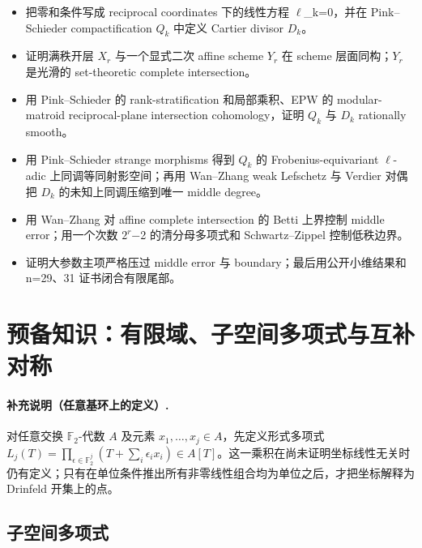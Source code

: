 \documentclass[11pt]{ctexart}
\begin{document}
\begin{itemize}

\item 把零和条件写成 reciprocal coordinates 下的线性方程 \ensuremath{\ell}\_k=0，并在 Pink–Schieder compactification \ensuremath{Q_{k}} 中定义 Cartier divisor \ensuremath{D_{k}}。

\item 证明满秩开层 \ensuremath{X_{r}} 与一个显式二次 affine scheme \ensuremath{Y_{r}} 在 scheme 层面同构；\ensuremath{Y_{r}} 是光滑的 set-theoretic complete intersection。

\item 用 Pink–Schieder 的 rank-stratification 和局部乘积、EPW 的 modular-matroid reciprocal-plane intersection cohomology，证明 \ensuremath{Q_{k}} 与 \ensuremath{D_{k}} rationally smooth。

\item 用 Pink–Schieder strange morphisms 得到 \ensuremath{Q_{k}} 的 Frobenius-equivariant \ensuremath{\ell}-adic 上同调等同射影空间；再用 Wan–Zhang weak Lefschetz 与 Verdier 对偶把 \ensuremath{D_{k}} 的未知上同调压缩到唯一 middle degree。

\item 用 Wan–Zhang 对 affine complete intersection 的 Betti 上界控制 middle error；用一个次数 \ensuremath{2^{r}}−2 的清分母多项式和 Schwartz–Zippel 控制低秩边界。

\item 证明大参数主项严格压过 middle error 与 boundary；最后用公开小维结果和 n=29、31 证书闭合有限尾部。

\end{itemize}

\section{预备知识：有限域、子空间多项式与互补对称}

\paragraph{补充说明（任意基环上的定义）.} 对任意交换 $\mathbb F_2$-代数 $A$ 及元素 $x_1,\ldots,x_j\in A$，先定义形式多项式 $L_j(T)=\prod_{\epsilon\in\mathbb F_2^j}(T+\sum_i\epsilon_i x_i)\in A[T]$。这一乘积在尚未证明坐标线性无关时仍有定义；只有在单位条件推出所有非零线性组合均为单位之后，才把坐标解释为 Drinfeld 开集上的点。

\subsection{子空间多项式}
\end{document}
